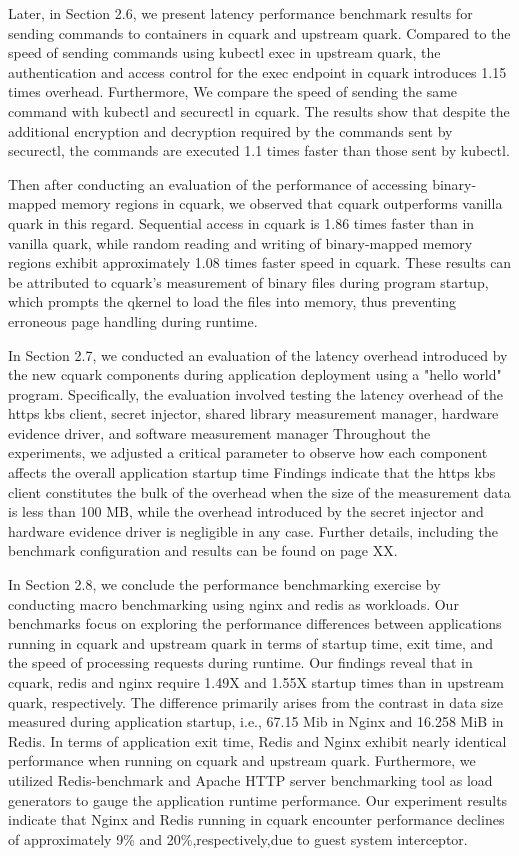 Later, in Section 2.6, we present latency performance benchmark results for sending commands to containers in cquark and upstream quark. Compared to the speed of sending commands using kubectl exec in upstream quark, the authentication and access control for the exec endpoint in cquark introduces 1.15 times overhead. Furthermore, We compare the speed of sending the same command with kubectl and securectl in cquark. The results show that despite the additional encryption and decryption required by the commands sent by securectl, the commands are executed 1.1 times faster than those sent by kubectl.

Then after conducting an evaluation of the performance of accessing binary-mapped memory regions in cquark, we observed that cquark outperforms vanilla quark in this regard. Sequential access in cquark is 1.86 times faster than in vanilla quark, while random reading and writing of binary-mapped memory regions exhibit approximately 1.08 times faster speed in cquark. These results can be attributed to cquark's measurement of binary files during program startup, which prompts the qkernel to load the files into memory, thus preventing erroneous page handling during runtime.

In Section 2.7, we conducted an evaluation of the latency overhead introduced by the new cquark components during application deployment using a "hello world" program.  Specifically, the evaluation involved testing the latency overhead of the https kbs client, secret injector, shared library measurement manager, hardware evidence driver, and software measurement manager Throughout the experiments, we adjusted a critical parameter to observe how each component affects the overall application startup time Findings indicate that the https kbs client constitutes the bulk of the overhead when the size of the measurement data is less than 100 MB, while the overhead introduced by the secret injector and hardware evidence driver is negligible in any case. Further details, including the benchmark configuration and results can be found on page XX.


In Section 2.8, we conclude the performance benchmarking exercise by conducting macro benchmarking using nginx and redis as workloads. Our benchmarks focus on exploring the performance differences between applications running in cquark and upstream quark in terms of startup time, exit time, and the speed of processing requests during runtime. Our findings reveal that in cquark, redis and nginx require 1.49X and 1.55X startup times than in upstream quark, respectively. The difference primarily arises from the contrast in data size measured during application startup, i.e., 67.15 Mib in Nginx and 16.258 MiB in Redis. In terms of application exit time, Redis and Nginx exhibit nearly identical performance when running on cquark and upstream quark. Furthermore, we utilized Redis-benchmark and Apache HTTP server benchmarking tool as load generators to gauge the application runtime performance. Our experiment results indicate that Nginx and Redis running in cquark encounter performance declines of approximately 9\% and 20\%,respectively,due to guest system interceptor.

